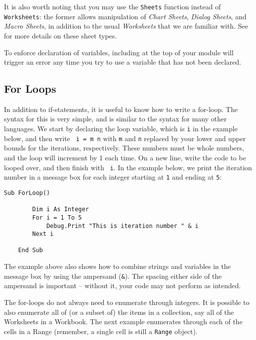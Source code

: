 \documentclass[11pt]{article}%
\begin{document}
It is also worth noting that you may use the \texttt{Sheets} function instead of \texttt{Worksheets}: the former allows manipulation of \textit{Chart Sheets}, \textit{Dialog Sheets}, and \textit{Macro Sheets}, in addition to the usual \textit{Worksheets} that we are familiar with. See \cite{xlSheetTypes} for more details on these sheet types.

To enforce declaration of variables, including  at the top of your module will trigger an error any time you try to use a variable that has not been declared.


\subsection{For Loops}

In addition to if-statements, it is useful to know how to write a for-loop. The syntax for this is very simple, and is similar to the syntax for many other languages. We start by declaring the loop variable, which is \texttt{i} in the example below, and then write \texttt{ i = m  n} with \texttt{m} and \texttt{n} replaced by your lower and upper bounds for the iterations, respectively. These numbers must be whole numbers, and the loop will increment by 1 each time. On a new line, write the code to be looped over, and then finish with \texttt{ i}. In the example below, we print the iteration number in a message box for each integer starting at \texttt{1} and ending at \texttt{5}:\\

\begin{lstlisting}[style=A]
    Sub ForLoop()

        Dim i As Integer
        For i = 1 To 5
            Debug.Print "This is iteration number " & i
        Next i

    End Sub
\end{lstlisting}

The example above also shows how to combine strings and variables in the message box by using the ampersand (\texttt{\&}). The spacing either side of the ampersand is important -- without it, your code may not perform as intended.

The for-loops do not always need to enumerate through integers. It is possible to also enumerate all of (or a subset of) the items in a collection, say all of the Worksheets in a Workbook. The next example enumerates through each of the cells in a Range (remember, a single cell is still a \texttt{Range} object).\\
\end{document}
